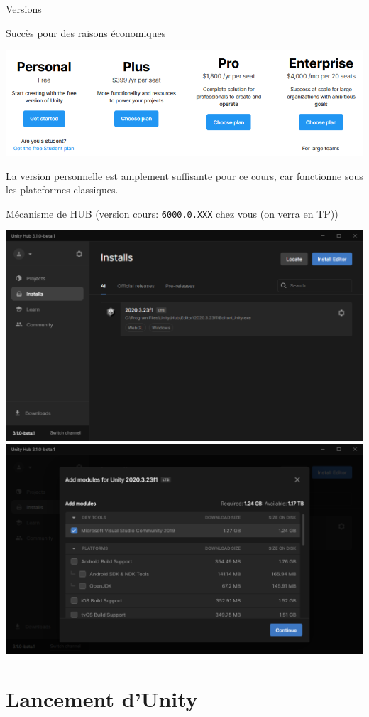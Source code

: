 \begin{frame}{Versions}
	\begin{block}{Succès pour des raisons économiques}
\begin{center}
	\includegraphics[width=0.5\linewidth]{../../imgs/licence_plan}
\end{center}

	La version personnelle est amplement suffisante pour ce cours, car fonctionne sous les plateformes classiques.
	\end{block}

	\begin{block}{Mécanisme de HUB (version cours: \texttt{6000.0.XXX} chez vous (on verra en TP))}
\begin{center}
\hfill
	\includegraphics[width=0.45\linewidth]{../../imgs/unity_hub}
\hfill
	\includegraphics[width=0.45\linewidth]{../../imgs/unity_hub_module}
\hfill
\end{center}

	\end{block}
\end{frame}

\section{Lancement d'Unity}

